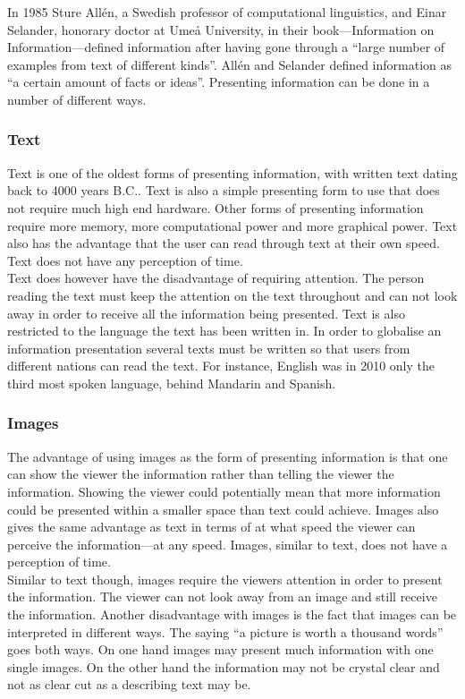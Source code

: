In 1985 Sture All{\'e}n, a Swedish professor of computational linguistics, and Einar Selander, honorary doctor at Ume{\aa} University, in their book---Information on Information---defined information after having gone through a ``large number of examples from text of different kinds''. All{\'e}n and Selander defined information as ``a certain amount of facts or ideas''.\cite{informationDef1} Presenting information can be done in a number of different ways.

\subsubsection{Text}
Text is one of the oldest forms of presenting information, with written text dating back to 4000 years B.C..\cite{cuneiform} Text is also a simple presenting form to use that does not require much high end hardware. Other forms of presenting information require more memory, more computational power and more graphical power. Text also has the advantage that the user can read through text at their own speed. Text does not have any perception of time.\\

Text does however have the disadvantage of requiring attention. The person reading the text must keep the attention on the text throughout and can not look away in order to receive all the information being presented. Text is also restricted to the language the text has been written in. In order to globalise an information presentation several texts must be written so that users from different nations can read the text. For instance, English was in 2010 only the third most spoken language, behind Mandarin and Spanish.\cite{sprakNe}

\subsubsection{Images}
The advantage of using images as the form of presenting information is that one can show the viewer the information rather than telling the viewer the information. Showing the viewer could potentially mean that more information could be presented within a smaller space than text could achieve. Images also gives the same advantage as text in terms of at what speed the viewer can perceive the information---at any speed. Images, similar to text, does not have a perception of time.\\

Similar to text though, images require the viewers attention in order to present the information. The viewer can not look away from an image and still receive the information. Another disadvantage with images is the fact that images can be interpreted in different ways. The saying ``a picture is worth a thousand words'' goes both ways. On one hand images may present much information with one single images. On the other hand the information may not be crystal clear and not as clear cut as a describing text may be.

